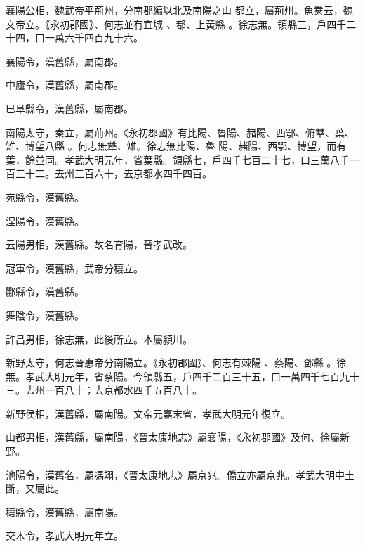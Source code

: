 \begin{pinyinscope}
襄陽公相，魏武帝平荊州，分南郡編以北及南陽之山
 都立，屬荊州。魚豢云，魏文帝立。《永初郡國》、何志並有宜城
 、鄀、上黃縣
 。徐志無。領縣三，戶四千二十四，口一萬六千四百九十六。



 襄陽令，漢舊縣，屬南郡。



 中廬令，漢舊縣，屬南郡。



 巳阜縣令，漢舊縣，屬南郡。


南陽太守，秦立，屬荊州。《永初郡國》有比陽、魯陽、赭陽、西鄂、俯犨、葉、雉、博望八縣
 。何志無犨、雉。徐志無比陽、魯
 陽、赭陽、西鄂、博望，而有葉，餘並同。孝武大明元年，省葉縣。領縣七，戶四千七百二十七，口三萬八千一百三十二。去州三百六十，去京都水四千四百。



 宛縣令，漢舊縣。



 涅陽令，漢舊縣。



 云陽男相，漢舊縣。故名育陽，晉孝武改。



 冠軍令，漢舊縣，武帝分穰立。



 酈縣令，漢舊縣。



 舞陰令，漢舊縣。



 許昌男相，徐志無，此後所立。本屬潁川。


新野太守，何志晉惠帝分南陽立。《永初郡國》、何志有棘陽
 、蔡陽、鄧縣
 。徐無。孝武大明元年，省蔡陽。今領縣五，戶四千二百三十五，口一萬四千七百九十三。去州一百八十；去京都水四千五百八十。



 新野侯相，漢舊縣，屬南陽。文帝元嘉末省，孝武大明元年復立。



 山都男相，漢舊縣，屬南陽，《晉太康地志》屬襄陽，《永初郡國》及何、徐屬新野。



 池陽令，漢舊名，屬馮翊，《晉太康地志》屬京兆。僑立亦屬京兆。孝武大明中土斷，又屬此。



 穰縣令，漢舊縣，屬南陽。



 交木令，孝武大明元年立。



\end{pinyinscope}
